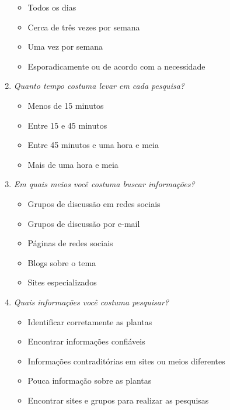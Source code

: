 \documentclass[
	12pt,				%
	a4paper,			%
	english,			%
	french,				%
	spanish,			%
	brazil,				%
	]{abntex2}
\begin{document}
\begin{anexosenv}
\begin{enumerate}
  \begin{itemize}
  \tightlist
  \item
    Todos os dias
  \item
    Cerca de três vezes por semana
  \item
    Uma vez por semana
  \item
    Esporadicamente ou de acordo com a necessidade
  \end{itemize}
\item
  \emph{Quanto tempo costuma levar em cada pesquisa?}

  \begin{itemize}
  \tightlist
  \item
    Menos de 15 minutos
  \item
    Entre 15 e 45 minutos
  \item
    Entre 45 minutos e uma hora e meia
  \item
    Mais de uma hora e meia
  \end{itemize}
\item
  \emph{Em quais meios você costuma buscar informações?}

  \begin{itemize}
  \tightlist
  \item
    Grupos de discussão em redes sociais
  \item
    Grupos de discussão por e-mail
  \item
    Páginas de redes sociais
  \item
    Blogs sobre o tema
  \item
    Sites especializados
  \end{itemize}
\item
  \emph{Quais informações você costuma pesquisar?}

  \begin{itemize}
  \tightlist
  \item
    Identificar corretamente as plantas
  \item
    Encontrar informações confiáveis
  \item
    Informações contraditórias em sites ou meios diferentes
  \item
    Pouca informação sobre as plantas
  \item
    Encontrar sites e grupos para realizar as pesquisas
  \end{itemize}
\end{enumerate}

\end{anexosenv}
\end{document}
